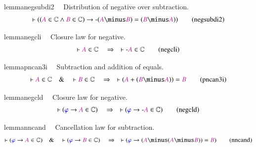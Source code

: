 \begin{restatable}{lemma}{negsubdi2}~~ Distribution of negative over
subtraction.  ~
\begin{align}
\vdash ( ( \mc{A} \in \mathbb{C} \wedge \mc{B} \in \mathbb{C} ) \rightarrow
    \textrm{-} ( \mc{A} \minus \mc{B} ) = ( \mc{B} \minus \mc{A} )
    )\label{eq:negsubdi2}\tag{negsubdi2}
\end{align}
\end{restatable}

\begin{restatable}{lemma}{negcli}~~ Closure law for negative.  ~
\begin{align}
\vdash \mc{A} \in \mathbb{C}\quad\Rightarrow\quad \vdash \textrm{-} \mc{A} \in
    \mathbb{C}\label{eq:negcli}\tag{negcli}
\end{align}
\end{restatable}

\begin{restatable}{lemma}{pncan3i}~~ Subtraction and addition of equals. 
~
\begin{align}
\vdash \mc{A} \in \mathbb{C}\quad\&\quad \vdash \mc{B} \in
    \mathbb{C}\quad\Rightarrow\quad \vdash ( \mc{A} + ( \mc{B} \minus \mc{A} )
    ) = \mc{B}\label{eq:pncan3i}\tag{pncan3i}
\end{align}
\end{restatable}

\begin{restatable}{lemma}{negcld}~~ Closure law for negative.  ~
\begin{align}
\vdash ( \mw{\varphi} \rightarrow \mc{A} \in \mathbb{C} )\quad\Rightarrow\quad
    \vdash ( \mw{\varphi} \rightarrow \textrm{-} \mc{A} \in \mathbb{C}
    )\label{eq:negcld}\tag{negcld}
\end{align}
\end{restatable}

\begin{restatable}{lemma}{nncand}~~ Cancellation law for subtraction. 
~
\begin{align}
\vdash ( \mw{\varphi} \rightarrow \mc{A} \in \mathbb{C} )\quad\&\quad \vdash (
    \mw{\varphi} \rightarrow \mc{B} \in \mathbb{C} )\quad\Rightarrow\quad
    \vdash ( \mw{\varphi} \rightarrow ( \mc{A} \minus ( \mc{A} \minus \mc{B} )
    ) = \mc{B} )\label{eq:nncand}\tag{nncand}
\end{align}
\end{restatable}

